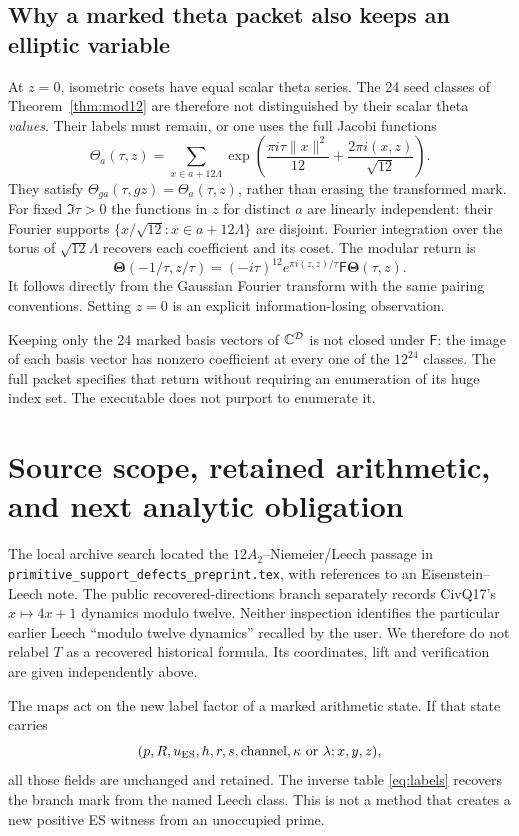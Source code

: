 \documentclass[11pt,reqno]{amsart}
\theoremstyle{definition}\newtheorem{definition}[theorem]{Definition}
\theoremstyle{remark}\newtheorem{remark}[theorem]{Remark}
\begin{document}
\subsection*{Why a marked theta packet also keeps an elliptic variable}
At $z=0$, isometric cosets have equal scalar theta series. The 24 seed classes of Theorem~\ref{thm:mod12} are therefore not distinguished by their scalar theta \emph{values}. Their labels must remain, or one uses the full Jacobi functions
\[
\Theta_a(\tau,z)=
\sum_{x\in a+12\Lambda}
\exp\left(\frac{\pi i\tau\|x\|^2}{12}
+\frac{2\pi i(x,z)}{\sqrt{12}}\right).
\]
They satisfy $\Theta_{ga}(\tau,gz)=\Theta_a(\tau,z)$, rather than erasing the transformed mark. For fixed $\Im\tau>0$ the functions in $z$ for distinct $a$ are linearly independent: their Fourier supports $\{x/\sqrt{12}:x\in a+12\Lambda\}$ are disjoint. Fourier integration over the torus of $\sqrt{12}\Lambda$ recovers each coefficient and its coset. The modular return is
\[
\boldsymbol\Theta(-1/\tau,z/\tau)
=(-i\tau)^{12}e^{\pi i(z,z)/\tau}\mathsf F\boldsymbol\Theta(\tau,z).
\]
It follows directly from the Gaussian Fourier transform with the same pairing conventions. Setting $z=0$ is an explicit information-losing observation.

Keeping only the 24 marked basis vectors of $\mathbb C^{\mathcal D}$ is not closed under $\mathsf F$: the image of each basis vector has nonzero coefficient at every one of the $12^{24}$ classes. The full packet specifies that return without requiring an enumeration of its huge index set. The executable does not purport to enumerate it.

\section{Source scope, retained arithmetic, and next analytic obligation}
The local archive search located the $12A_2$--Niemeier/Leech passage in \nolinkurl{primitive_support_defects_preprint.tex}, with references to an Eisenstein--Leech note. The public recovered-directions branch separately records CivQ17's $x\mapsto4x+1$ dynamics modulo twelve. Neither inspection identifies the particular earlier Leech ``modulo twelve dynamics'' recalled by the user. We therefore do not relabel $T$ as a recovered historical formula. Its coordinates, lift and verification are given independently above.

The maps act on the new label factor of a marked arithmetic state. If that state carries
\[
(p,R,u_{\rm ES},h,r,s,\text{channel},\kappa\text{ or }\lambda;x,y,z),
\]
all those fields are unchanged and retained. The inverse table \eqref{eq:labels} recovers the branch mark from the named Leech class. This is not a method that creates a new positive ES witness from an unoccupied prime.
\end{document}

